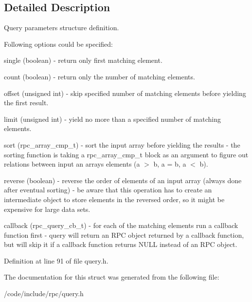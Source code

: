 \subsection{Detailed Description}
Query parameters structure definition.

Following options could be specified\+:
\begin{DoxyItemize}
\item single (boolean) -\/ return only first matching element.
\item count (boolean) -\/ return only the number of matching elements.
\item offset (unsigned int) -\/ skip specified number of matching elements before yielding the first result.
\item limit (unsigned int) -\/ yield no more than a specified number of matching elements.
\item sort (rpc\+\_\+array\+\_\+cmp\+\_\+t) -\/ sort the input array before yielding the results -\/ the sorting function is taking a rpc\+\_\+array\+\_\+cmp\+\_\+t block as an argument to figure out relations between input an array\textquotesingle{}s elements (a $>$ b, a = b, a $<$ b).
\item reverse (boolean) -\/ reverse the order of elements of an input array (always done after eventual sorting) -\/ be aware that this operation has to create an intermediate object to store elements in the reversed order, so it might be expensive for large data sets.
\item callback (rpc\+\_\+query\+\_\+cb\+\_\+t) -\/ for each of the matching elements run a callback function first -\/ query will return an R\+PC object returned by a callback function, but will skip it if a callback function returns N\+U\+LL instead of an R\+PC object. 
\end{DoxyItemize}

Definition at line 91 of file query.\+h.



The documentation for this struct was generated from the following file\+:\begin{DoxyCompactItemize}
\item 
/code/include/rpc/query.\+h\end{DoxyCompactItemize}

